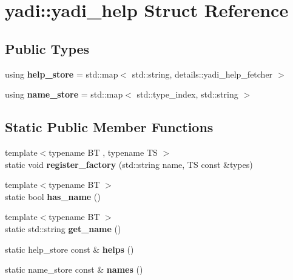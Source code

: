 \hypertarget{structyadi_1_1yadi__help}{}\section{yadi\+:\+:yadi\+\_\+help Struct Reference}
\label{structyadi_1_1yadi__help}
\subsection*{Public Types}
\begin{DoxyCompactItemize}
\item 
\mbox{\label{structyadi_1_1yadi__help_a3f208166dac982fc5ea2da59cccfd51e}} 
using {\bfseries help\+\_\+store} = std\+::map$<$ std\+::string, details\+::yadi\+\_\+help\+\_\+fetcher $>$
\item 
\mbox{\label{structyadi_1_1yadi__help_aaa85b3a9116a8dd35a91db333576bf59}} 
using {\bfseries name\+\_\+store} = std\+::map$<$ std\+::type\+\_\+index, std\+::string $>$
\end{DoxyCompactItemize}
\subsection*{Static Public Member Functions}
\begin{DoxyCompactItemize}
\item 
\mbox{\label{structyadi_1_1yadi__help_add1c3496248cd02834c8bd835d4ac417}} 
{\footnotesize template$<$typename BT , typename TS $>$ }\\static void {\bfseries register\+\_\+factory} (std\+::string name, TS const \&types)
\item 
\mbox{\label{structyadi_1_1yadi__help_ade91b0fb56b72ee34c7e3be193faac02}} 
{\footnotesize template$<$typename BT $>$ }\\static bool {\bfseries has\+\_\+name} ()
\item 
\mbox{\label{structyadi_1_1yadi__help_a106e37c78f02730ba7d54f9892932ede}} 
{\footnotesize template$<$typename BT $>$ }\\static std\+::string {\bfseries get\+\_\+name} ()
\item 
\mbox{\label{structyadi_1_1yadi__help_a9ddef20988be744f132c45009a4c3810}} 
static help\+\_\+store const  \& {\bfseries helps} ()
\item 
\mbox{\label{structyadi_1_1yadi__help_a41fb4a566cae38f7530d1c9f08f72a8f}} 
static name\+\_\+store const  \& {\bfseries names} ()
\end{DoxyCompactItemize}


